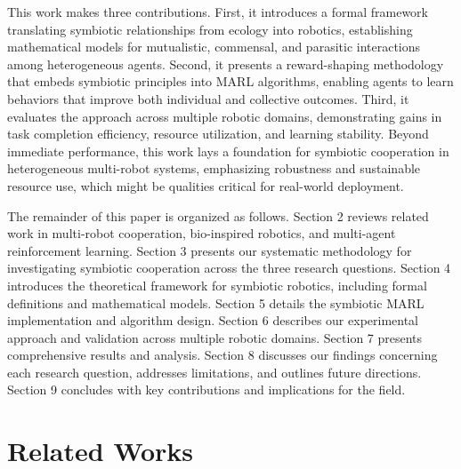 \documentclass[Afour,sageh,times]{sagej}
\begin{document}
This work makes three contributions. First, it introduces a formal framework translating symbiotic relationships from ecology into robotics, establishing mathematical models for mutualistic, commensal, and parasitic interactions among heterogeneous agents. Second, it presents a reward-shaping methodology that embeds symbiotic principles into MARL algorithms, enabling agents to learn behaviors that improve both individual and collective outcomes. Third, it evaluates the approach across multiple robotic domains, demonstrating gains in task completion efficiency, resource utilization, and learning stability. Beyond immediate performance, this work lays a foundation for symbiotic cooperation in heterogeneous multi-robot systems, emphasizing robustness and sustainable resource use, which might be qualities critical for real-world deployment.

The remainder of this paper is organized as follows. Section 2 reviews related work in multi-robot cooperation, bio-inspired robotics, and multi-agent reinforcement learning. Section 3 presents our systematic methodology for investigating symbiotic cooperation across the three research questions. Section 4 introduces the theoretical framework for symbiotic robotics, including formal definitions and mathematical models. Section 5 details the symbiotic MARL implementation and algorithm design. Section 6 describes our experimental approach and validation across multiple robotic domains. Section 7 presents comprehensive results and analysis. Section 8 discusses our findings concerning each research question, addresses limitations, and outlines future directions. Section 9 concludes with key contributions and implications for the field.

\section{Related Works}
\end{document}
